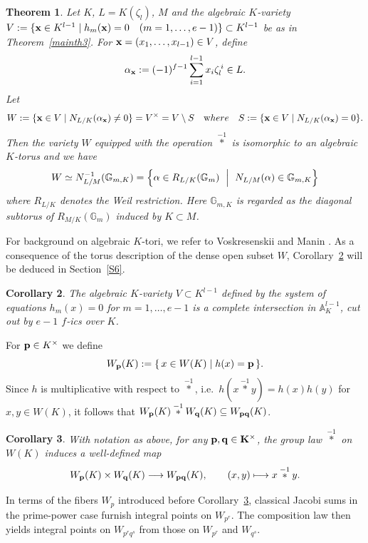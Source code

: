 \documentclass[a4paper, 11pt]{amsart}
\theoremstyle{plain}
\newtheorem{thm}{Theorem}[section]
\newtheorem{cor}[thm]{Corollary}
\theoremstyle{definition}
\numberwithin{equation}{section}
\begin{document}
\begin{thm}\label{thm:structureV}
Let $K$, $L=K(\zeta_l)$, $M$ and the algebraic $K$-variety $V:=\{{\bf x}\in K^{l-1} \mid h_{m}({\bf x})=0\quad (m = 1,\ldots,e-1) \} \subset K^{l-1}$ be as in Theorem~\ref{mainth3}. 
For ${\bf x}=(x_1,\dots,x_{l-1})\in V$, define
\[
  \alpha_{\bf x}:=(-1)^{f-1}\sum_{i=1}^{l-1} x_i \zeta_l^{\,i}\in L.
\]
Let
\[
  W:=\{{\bf x}\in V \mid N_{L/K}(\alpha_{\bf x})\neq 0\}=V^\times=V\setminus S
  \quad {\text where}\quad S:=\{{\bf x}\in V \mid N_{L/K}(\alpha_{\bf x})=0\}.
\]
Then the variety $W$ equipped with the operation $\overset{-1}{\ast}$ is isomorphic to an algebraic $K$-torus and we have
\[
  W \simeq N_{L/M}^{-1}(\mathbb{G}_{m,K})= \left\{ \alpha \in R_{L/K}(\mathbb{G}_m) \ \Bigm|\  N_{L/M}(\alpha) \in \mathbb{G}_{m,K} \right\}
\]
where $R_{L/K}$ denotes the Weil restriction. 
Here $\mathbb{G}_{m,K}$ is regarded as the diagonal subtorus of $R_{M/K}(\mathbb{G}_m)$ induced by $K \subset M$.
\end{thm}

For background on algebraic $K$-tori, we refer to Voskresenskii \cite[Chapter~2]{Vos98} and Manin \cite[Section~30]{Man74}.
As a consequence of the torus description of the dense open subset $W$, Corollary~\ref{cor:CI} will be deduced in Section~\ref{S6}.

\begin{cor}\label{cor:CI}
The algebraic $K$-variety $V \subset K^{l-1}$ defined by the system of equations $h_{m}(x)=0$ for $m=1,\dots,e-1$ is a complete intersection in $\mathbb{A}^{l-1}_K$, cut out by $e-1$ $f$-ics over $K$.
\end{cor}

For ${\bf p}\in K^\times$ we define
\[
W_{\bf p}(K):=\{\,x\in W(K)\mid h(x)={\bf p}\,\}.
\]
Since $h$ is multiplicative with respect to $\overset{-1}{\ast}$, i.e.\ $h(x\overset{-1}{\ast}y)=h(x)h(y)$ for $x,y\in W(K)$, it follows that $W_{\bf p}(K)\overset{-1}{\ast}W_{\bf q}(K)\subseteq W_{{\bf p}{\bf q}}(K)$.

\begin{cor}\label{cor:lifting}
With notation as above,  for any $\bf{p},\bf{q} \in K^\times$, the group law $\overset{-1}{\ast}$ on $W(K)$ induces
a well-defined map
\[
  W_{\bf{p}}(K) \times W_{\bf{q}}(K) \longrightarrow W_{\bf{pq}}(K),
  \qquad (x,y) \longmapsto x \overset{-1}{\ast} y.
\]
\end{cor}

In terms of the fibers $W_p$ introduced before Corollary~\ref{cor:lifting},
classical Jacobi sums in the prime-power case furnish integral points on $W_{p^r}$. 
The composition law then yields integral points on $W_{p^r q^s}$ from those on $W_{p^r}$ and $W_{q^s}$.
\end{document}
